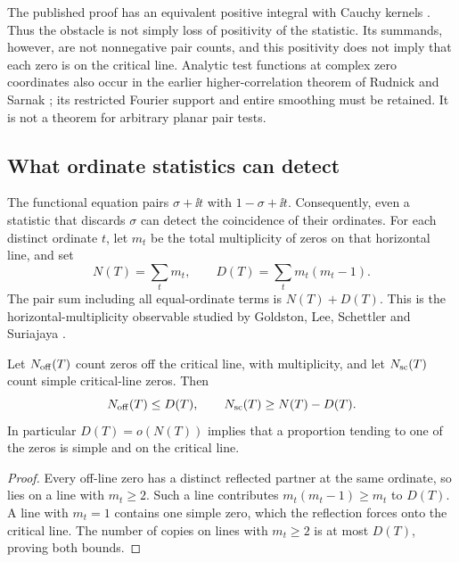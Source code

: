The published proof has an equivalent positive integral with
Cauchy kernels \cite[Lemma~3, (2.6)]{BGST2024}.
Thus the obstacle is not simply loss of positivity of the
statistic. Its summands, however, are not nonnegative pair
counts, and this positivity does not imply that each zero is
on the critical line. Analytic test functions at complex zero
coordinates also occur in the earlier higher-correlation theorem
of Rudnick and Sarnak \cite[Theorem~1.1]{RudnickSarnak1996};
its restricted Fourier support and entire smoothing must be
retained. It is not a theorem for arbitrary planar pair tests.

\subsection{What ordinate statistics can detect}
The functional equation pairs \(\sigma+\ii t\) with
\(1-\sigma+\ii t\). Consequently, even a statistic that discards
\(\sigma\) can detect the coincidence of their ordinates.
For each distinct ordinate \(t\), let \(m_t\) be the total
multiplicity of zeros on that horizontal line, and set
\begin{equation}\label{eq:horizontal-excess}
 N(T)=\sum_t m_t,\qquad D(T)=\sum_t m_t(m_t-1).
\end{equation}
The pair sum including all equal-ordinate terms is \(N(T)+D(T)\).
This is the horizontal-multiplicity observable studied by
Goldston, Lee, Schettler and Suriajaya
\cite[Sections~7--8]{GLSS2026}.

\begin{proposition}\label{prop:horizontal}
Let \(N_{\rm off}(T)\) count zeros off the critical line, with
multiplicity, and let \(N_{\rm sc}(T)\) count simple critical-line
zeros. Then
\begin{equation}\label{eq:horizontal-bounds}
 N_{\rm off}(T)\le D(T),\qquad
 N_{\rm sc}(T)\ge N(T)-D(T).
\end{equation}
In particular \(D(T)=o(N(T))\) implies that a proportion tending
to one of the zeros is simple and on the critical line.
\end{proposition}
\begin{proof}
Every off-line zero has a distinct reflected partner at the
same ordinate, so lies on a line with \(m_t\ge2\). Such a line
contributes \(m_t(m_t-1)\ge m_t\) to \(D(T)\). A line with
\(m_t=1\) contains one simple zero, which the reflection forces
onto the critical line. The number of copies on lines with
\(m_t\ge2\) is at most \(D(T)\), proving both bounds.
\end{proof}

